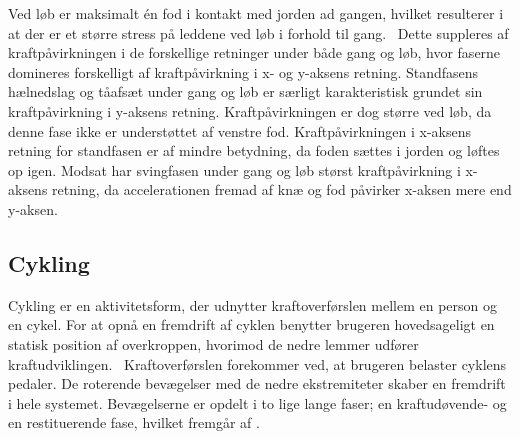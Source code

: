 Ved løb er maksimalt én fod i kontakt med jorden ad gangen, hvilket resulterer i at der er et større stress på leddene ved løb i forhold til gang.~\citep{Adelaar1986} Dette suppleres af kraftpåvirkningen i de forskellige retninger under både gang og løb, hvor faserne domineres forskelligt af kraftpåvirkning i x- og y-aksens retning. \newline 
Standfasens hælnedslag og tåafsæt under gang og løb  er særligt karakteristisk grundet sin kraftpåvirkning i y-aksens retning. Kraftpåvirkningen er dog større ved løb, da denne fase ikke er understøttet af venstre fod. Kraftpåvirkningen i x-aksens retning for standfasen er af mindre betydning, da foden sættes i jorden og løftes op igen. Modsat har svingfasen under gang og løb størst kraftpåvirkning i x-aksens retning, da accelerationen fremad af knæ og fod påvirker x-aksen mere end y-aksen.~\citep{Rueterbories2010} 
\subsection{Cykling}
Cykling er en aktivitetsform, der udnytter kraftoverførslen mellem en person og en cykel. For at opnå en fremdrift af cyklen benytter brugeren hovedsageligt en statisk position af overkroppen, hvorimod de nedre lemmer udfører kraftudviklingen.~\citep{Springer2014} Kraftoverførslen forekommer ved, at brugeren belaster cyklens pedaler. De roterende bevægelser med de nedre ekstremiteter skaber en fremdrift i hele systemet. Bevægelserne er opdelt i to lige lange faser; en kraftudøvende- og en restituerende fase, hvilket fremgår af .

